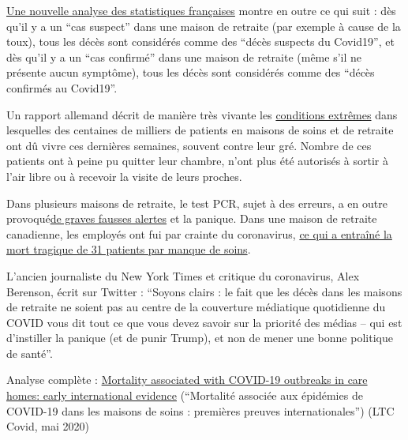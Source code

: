 \href{https://covidinfos.net/covid19/deces-dus-au-covid-19-le-nombre-officiel-de-morts-en-france-est-il-surestime/502/}{Une
nouvelle analyse des statistiques françaises} montre en outre ce qui
suit : dès qu'il y a un ``cas suspect'' dans une maison de retraite (par
exemple à cause de la toux), tous les décès sont considérés comme des
``décès suspects du Covid19'', et dès qu'il y a un ``cas confirmé'' dans
une maison de retraite (même s'il ne présente aucun symptôme), tous les
décès sont considérés comme des ``décès confirmés au Covid19''.

Un rapport allemand décrit de manière très vivante les
\href{https://www.rnd.de/gesundheit/corona-ist-mir-egal-warum-helga-witt-kronshage-86-lieber-sterben-will-als-eingesperrt-zu-sein-3MEBDIOBEFA6BDULC4N5WGZJG4.html}{conditions
extrêmes} dans lesquelles des centaines de milliers de patients en
maisons de soins et de retraite ont dû vivre ces dernières semaines,
souvent contre leur gré. Nombre de ces patients ont à peine pu quitter
leur chambre, n'ont plus été autorisés à sortir à l'air libre ou à
recevoir la visite de leurs proches.

Dans plusieurs maisons de retraite, le test PCR, sujet à des erreurs, a
en outre
provoqué\href{https://www.wjhl.com/local-coronavirus-coverage/agape-nursing-home-says-residents-who-tested-positive-for-covid-19-were-false-positives/}{de
graves fausses alertes} et la panique. Dans une maison de retraite
canadienne, les employés ont fui par crainte du coronavirus,
\href{https://www.nytimes.com/2020/04/16/world/canada/montreal-nursing-homes-coronavirus.html}{ce
qui a entraîné la mort tragique de 31 patients par manque de soins}.

L'ancien journaliste du New York Times et critique du coronavirus, Alex
Berenson, écrit sur Twitter : ``Soyons clairs : le fait que les décès
dans les maisons de retraite ne soient pas au centre de la couverture
médiatique quotidienne du COVID vous dit tout ce que vous devez savoir
sur la priorité des médias -- qui est d'instiller la panique (et de
punir Trump), et non de mener une bonne politique de santé''.

Analyse complète :
\href{https://ltccovid.org/2020/04/12/mortality-associated-with-covid-19-outbreaks-in-care-homes-early-international-evidence/}{Mortality
associated with COVID-19 outbreaks in care homes: early international
evidence} (``Mortalité associée aux épidémies de COVID-19 dans les
maisons de soins : premières preuves internationales'') (LTC Covid, mai
2020)

